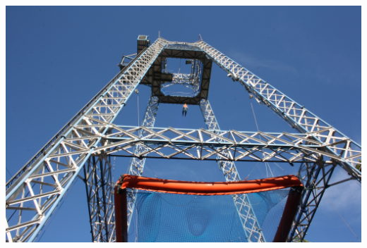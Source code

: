 \begin{minipage}[b]{0.95\linewidth}
\begin{minipage}[t]{0.47\textwidth}
\end{minipage}
\begin{center}
\includegraphics[width=\linewidth]{taarn.jpg}
\end{center}
\end{minipage}
